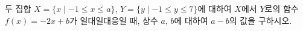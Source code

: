 두 집합 $X=\{x \mid -1\le x\le a\}$, $Y=\{y \mid -1\le y\le 7\}$에 대하여 $X$에서 $Y$로의 함수 $f(x)=-2x+b$가 일대일대응일 때, 상수 $a$, $b$에 대하여 $a-b$의 값을 구하시오.
